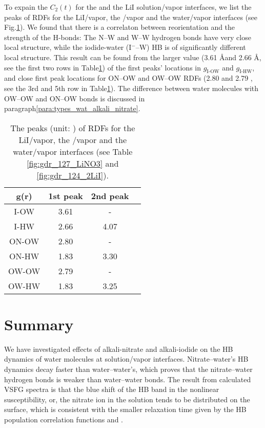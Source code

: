 To expain the $C_2(t)$ for the \LiN and the LiI solution/vapor interfaces, 
we list the peaks of RDFs for the LiI/vapor, the \LiN/vapor and the water/vapor interfaces (see Fig.\thinspace\ref{tab:rdf_I2wat_peaks}).
We found that there is a correlaton between reorientation and the strength of the H-bonds:
The N--W and W--W hydrogen bonds have very close local structure, while the iodide-water (I$^-$--W) HB is of significantly different local structure.
This result can be found from the larger value (3.61 \AA and 2.66 \AA, 
see the first two rows in Table\thinspace\ref{tab:rdf_I2wat_peaks}) of the first peaks' locations in $g_\text{I-OW}$ and $g_\text{I-HW}$,
and close first peak locations for ON--OW and OW--OW RDFs (2.80 \A and 2.79 \A, see the 3rd and 5th row in Table\thinspace\ref{tab:rdf_I2wat_peaks}). 
The difference between water molecules with OW--OW and ON--OW bonds is discussed in paragraph\thinspace\ref{para:types_wat_alkali_nitrate}.
\begin{table}[H]
\centering
\caption{\label{tab:rdf_I2wat_peaks} 
The peaks (unit: \A) of RDFs for the LiI/vapor, the \LiN/vapor and the water/vapor interfaces (see Table \ref{fig:gdr_127_LiNO3} and \ref{fig:gdr_124_2LiI}). 
}
\begin{tabular}{cccc}
 g(r) & 1st peak & 2nd peak \\
\hline
 I-OW & 3.61 & - \\
 I-HW & 2.66 & 4.07 \\
 ON-OW & 2.80 & -\\
 ON-HW & 1.83 & 3.30 \\
 OW-OW & 2.79 & - \\
 OW-HW & 1.83 & 3.25 \\
\end{tabular}
\end{table} 

\section{Summary}
We have investigated effects of alkali-nitrate and alkali-iodide on the HB dynamics
of water molecules at solution/vapor interfaces.
Nitrate--water's HB dynamics decay faster than water--water's, 
which proves that the nitrate--water hydrogen bonds is weaker than water--water bonds. 
The result from calculated VSFG spectra is that the blue shift of the HB band in the nonlinear susceptibility, 
or, the nitrate ion in the solution tends to be distributed on the surface, 
which is consistent with the smaller relaxation time given by the HB population correlation functions \CHB and \SHB.

